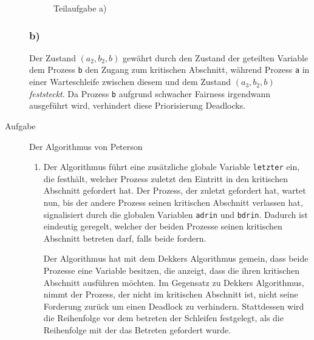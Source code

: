 \documentclass[a4paper,twoside,12pt,fleqn]{article}
\newcounter{AUFGNR}
\newcommand{\AUFGABE}[2]{\vspace{0.3cm}\item[Aufgabe~\arabic{AUFGNR}]\stepcounter{AUFGNR} #1\hfill\emph{#2}}
\begin{document}
\begin{description}
\begin{figure}[htbp]
		\caption{Teilaufgabe a)}
	\end{figure}
	\subsubsection*{b)}
	Der Zustand $(a_2, b_2, b)$ gewährt durch den Zustand der geteilten Variable dem Prozess \texttt{b} den Zugang zum kritischen Abschnitt, während Prozess \texttt{a} in einer Warteschleife zwischen diesem und dem Zustand $(a_3, b_2, b)$ \textit{feststeckt}. Da Prozess \texttt{b} aufgrund schwacher Fairness irgendwann ausgeführt wird, verhindert diese Priorisierung Deadlocks.

	\AUFGABE{Der Algorithmus von Peterson}{}
	\begin{enumerate}
		\item Der Algorithmus führt eine zusätzliche globale Variable \texttt{letzter} ein, die festhält, welcher Prozess zuletzt den Eintritt in den kritischen Abschnitt gefordert hat. Der Prozess, der zuletzt gefordert hat, wartet nun, bis der andere Prozess seinen kritischen Abschnitt verlassen hat, signalisiert durch die globalen Variablen \texttt{adrin} und \texttt{bdrin}. Dadurch ist eindeutig geregelt, welcher der beiden Prozesse seinen kritischen Abschnitt betreten darf, falls beide fordern.

		      Der Algorithmus hat mit dem Dekkers Algorithmus gemein, dass beide Prozesse eine Variable besitzen, die anzeigt, dass die ihren kritischen Abschnitt ausführen möchten. Im Gegensatz zu Dekkers Algorithmus, nimmt der Prozess, der nicht im kritischen Abschnitt ist, nicht seine Forderung zurück um einen Deadlock zu verhindern. Stattdessen wird die Reihenfolge vor dem betreten der Schleifen festgelegt, als die Reihenfolge mit der das Betreten gefordert wurde.
	\end{enumerate}


\end{description}
\end{document}
